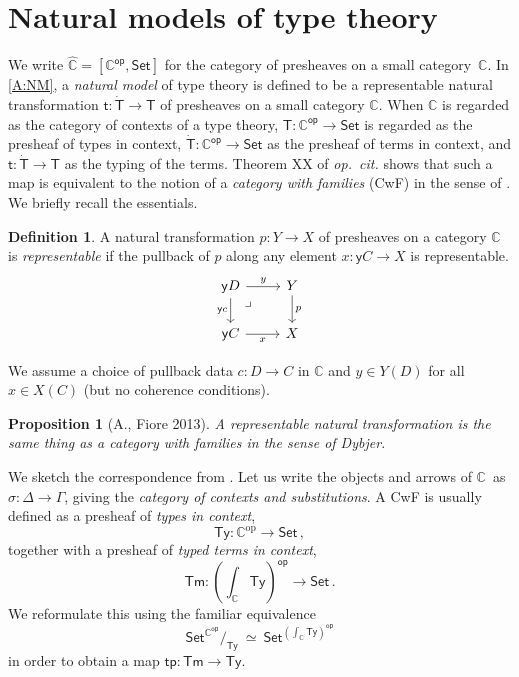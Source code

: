 \documentclass[12pt]{article}
\newcommand{\C}{\ensuremath{\mathbb{C}}}
\newcommand{\op}[1]{\ensuremath{{#1}^{\mathsf{op}}}}
\newcommand{\pshx}[1]{\ensuremath{\mathsf{Set}^{\op{#1}}}}
\newcommand{\psh}[1]{\ensuremath{[\op{#1},\mathsf{Set}]}}
\newcommand{\Set}{\ensuremath{\mathsf{Set}}}
\newcommand{\y}{\ensuremath{\mathsf{y}}} %
\newcommand{\tp}{\ensuremath{\mathsf{tp}}}
\newcommand{\Tm}{\ensuremath{\mathsf{Tm}}}
\newcommand{\Ty}{\ensuremath{\mathsf{Ty}}}
\renewcommand{\to}{\ensuremath{\rightarrow}}
\renewcommand{\t}{\ensuremath{\mathsf{t}}}
\newcommand{\T}{\ensuremath{\mathsf{T}}}
\newcommand{\TT}{\ensuremath{\dot{\mathsf{T}}}}
\newcommand{\pbcorner}{\arrow[dr,phantom,"\lrcorner" very near start, shift right=.5ex]} %
\newtheorem{proposition}[theorem]{Proposition}
\theoremstyle{remark}
\theoremstyle{definition}
\newtheorem{definition}[theorem]{Definition}
\begin{document}
\section{Natural models of type theory}\label{sec:NaturalModels}

\noindent We write $\widehat{\C} = \psh{\C}$ for the category of presheaves on a small category~$\C$.
%
In \eqref{A:NM}, a \emph{natural model} of type theory is defined to be a representable natural transformation $\t: \TT\to \T$ of presheaves on a small category $\C$.  When $\C$ is regarded as the category of contexts of a type theory, $\T: \op{\C} \to \Set$ is regarded as the presheaf of types in context, $\TT: \op{\C} \to \Set$ as the presheaf of terms in context, and $\t : \TT\to\T$ as the typing of the terms.   Theorem XX of \emph{op.\ cit.} shows that such a map is equivalent to the notion of a \emph{category with families} (CwF) in the sense of \cite{Dybjer}.  We briefly recall the essentials.

\begin{definition}\label{def:representablenattrans} A natural transformation $p : Y \to X$ of presheaves on a category $\C$  is \emph{representable} if the pullback of $p$ along any element $x: \y{C} \to X$ is representable.
\begin{equation*}
\begin{tikzcd}
 \y{D} \ar[d,swap,"{\y{c}}"] \ar[r,"y"] \pbcorner &  Y \ar[d, "p"]\\
\y{C} \ar[r,swap,"x"]  & X
\end{tikzcd}
\end{equation*}
\end{definition}
We assume a choice of pullback data $c : D \to C$ in $\C$ and $y \in Y(D)$ for all $x\in X(C)$ (but no coherence conditions).

\begin{proposition}[A., Fiore 2013] A representable natural transformation is the same thing as a \emph{category with families} in the sense of Dybjer.
\end{proposition}

We sketch the correspondence from \cite{Awodey:NM}.
Let us write the objects and arrows of \C\ as $\sigma : \Delta \to \Gamma$, giving the \emph{category of contexts and substitutions}.
A CwF is usually defined as a presheaf of \emph{types in context}, 
\[
\Ty : \C^{\mathrm{op}}\to \Set\,,
\]
together with a presheaf of \emph{typed terms in context}, 
\[
\Tm : {\textstyle (\int_{\C}\!\Ty)^{\mathsf{op}}\to \Set }\,.
\]
We reformulate this using the familiar equivalence
\[\textstyle
 \pshx{\C}\!/_{\Ty}\ \simeq\ \pshx{(\int_{\C}\Ty)}
\]
in order to obtain a map $\tp :\Tm \to \Ty$.
\end{document}
